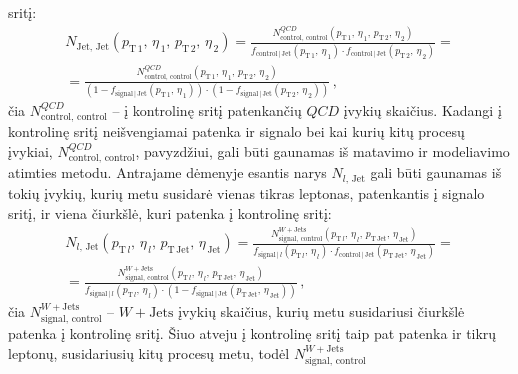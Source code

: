 \documentclass[a4paper, 12pt, oneside]{article}
\newcommand{\WJets}{W\! +\!\mathrm{Jets}}
\newcommand{\QCD}{QC\! D}
\newlength\q
\begin{document}
sritį:
\begin{multline}
	\label{eq:FRQCD}
	N_{\mathrm{Jet, \, Jet}}(p_{\mathrm{T}\, 1}, \, \eta_{\, 1}, \, p_{\mathrm{T}\, 2}, \, \eta_{\, 2}) =
	\frac{N^{\QCD}_{\mathrm{control, \, control}}(p_{\mathrm{T}\, 1}, \, \eta_{\, 1}, \, p_{\mathrm{T}\, 2}, \, \eta_{\, 2})}
	{f_{\mathrm{control} \,| \,\mathrm{Jet}}(p_{\mathrm{T}\, 1}, \, \eta_{\, 1}) \cdot
	f_{\mathrm{control} \,| \,\mathrm{Jet}}(p_{\mathrm{T}\, 2}, \, \eta_{\, 2})} = \\[10pt] =
	\frac{N^{\QCD}_{\mathrm{control, \, control}}(p_{\mathrm{T}\, 1}, \, \eta_{\, 1}, \, p_{\mathrm{T}\, 2}, \, \eta_{\, 2})}
	{\left(1-f_{\mathrm{signal} \,| \,\mathrm{Jet}}(p_{\mathrm{T}\, 1}, \, \eta_{\, 1})\right) \cdot
	\left(1-f_{\mathrm{signal} \,| \,\mathrm{Jet}}(p_{\mathrm{T}\, 2}, \, \eta_{\, 2})\right)} \, ,
\end{multline}
čia $N^{\QCD}_{\mathrm{control, \, control}}$ -- į kontrolinę sritį patenkančių $\QCD$ įvykių skaičius.
Kadangi į kontrolinę sritį neišvengiamai patenka ir signalo bei kai kurių kitų procesų įvykiai, $N^{\QCD}_{\mathrm{control, \, control}}$,
pavyzdžiui, gali būti gaunamas iš matavimo ir modeliavimo atimties metodu.
Antrajame dėmenyje esantis narys $N_{l, \, \mathrm{Jet}}$ gali būti gaunamas iš tokių įvykių,
kurių metu susidarė vienas tikras leptonas, patenkantis į signalo sritį, ir viena čiurkšlė, kuri patenka į kontrolinę sritį:
\begin{multline}
	\label{eq:FRWjets}
	N_{l, \, \mathrm{Jet}}(p_{\mathrm{T}\, l}, \, \eta_{\, l}, \, p_{\mathrm{T}\, \mathrm{Jet}}, \, \eta_{\, \mathrm{Jet}}) =
	\frac{N^{\WJets}_{\mathrm{signal, \, control}}(p_{\mathrm{T}\, l}, \, \eta_{\, l}, \, p_{\mathrm{T\, Jet}}, \, \eta_{\,\mathrm{Jet}})}
	{f_{\mathrm{signal} \,| \, l}(p_{\mathrm{T}\, l}, \, \eta_{\, l})\cdot
	f_{\mathrm{control} \,| \, \mathrm{Jet}}(p_{\mathrm{T\, Jet}}, \, \eta_{\,\mathrm{Jet}})} = \\[10pt] =
	\frac{N^{\WJets}_{\mathrm{signal, \, control}}(p_{\mathrm{T}\, l}, \, \eta_{\, l}, \, p_{\mathrm{T\, Jet}}, \, \eta_{\,\mathrm{Jet}})}
	{f_{\mathrm{signal} \,| \, l}(p_{\mathrm{T}\, l}, \, \eta_{\, l})\cdot
	\left( 1 - f_{\mathrm{signal} \,| \, \mathrm{Jet}}(p_{\mathrm{T\, Jet}}, \, \eta_{\,\mathrm{Jet}}) \right)}	\, ,
\end{multline}
čia $N^{\WJets}_{\mathrm{signal, \, control}}$ -- $\WJets$ įvykių skaičius, kurių metu susidariusi čiurkšlė patenka į kontrolinę sritį.
Šiuo atveju į kontrolinę sritį taip pat patenka ir tikrų leptonų, susidariusių kitų procesų metu, todėl $N^{\WJets}_{\mathrm{signal, \, control}}$
\end{document}
